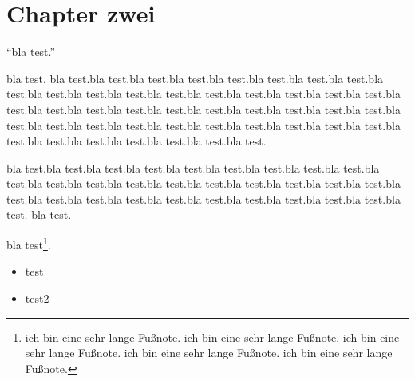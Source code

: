 \chapter{Chapter zwei}
\enquote{bla test.}

bla test. bla test.bla test.bla test.bla test.bla test.bla test.bla test.bla test.bla test.bla test.bla test.bla test.bla test.bla test.bla test.bla test.bla test.bla test.bla test.bla test.bla test.bla test.bla test.bla test.bla test.bla test.bla test.bla test.bla test.bla test.bla test.bla test.bla test.bla test.bla test.bla test.bla test.bla test.bla test.bla test.bla test.bla test.bla test.bla test.bla test.

bla test.bla test.bla test.bla test.bla test.bla test.bla test.bla test.bla test.bla test.bla test.bla test.bla test.bla test.bla test.bla test.bla test.bla test.bla test.bla test.bla test.bla test.bla test.bla test.bla test.bla test.bla test.bla test.bla test.bla test.
bla test.

bla test\footnote{ich bin eine sehr lange Fußnote. ich bin eine sehr lange Fußnote. ich bin eine sehr lange Fußnote. ich bin eine sehr lange Fußnote. ich bin eine sehr lange Fußnote.}.

\begin{itemize}
    \item test
    \item test2
\end{itemize}

